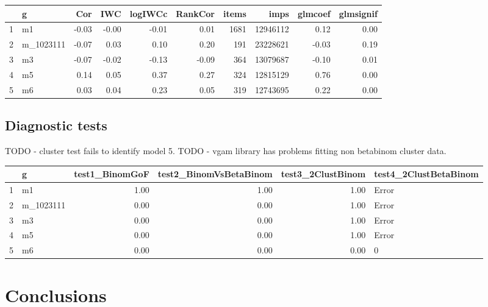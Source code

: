 \documentclass[12pt]{article}
\begin{document}
\begin{table}[ht]
\centering
\begin{tabular}{rlrrrrrrrr}
  \hline
 & g & Cor & IWC & logIWCc & RankCor & items & imps & glmcoef & glmsignif \\ 
  \hline
1 & m1 & -0.03 & -0.00 & -0.01 & 0.01 & 1681 & 12946112 & 0.12 & 0.00 \\ 
  2 & m\_1023111 & -0.07 & 0.03 & 0.10 & 0.20 & 191 & 23228621 & -0.03 & 0.19 \\ 
  3 & m3 & -0.07 & -0.02 & -0.13 & -0.09 & 364 & 13079687 & -0.10 & 0.01 \\ 
  4 & m5 & 0.14 & 0.05 & 0.37 & 0.27 & 324 & 12815129 & 0.76 & 0.00 \\ 
  5 & m6 & 0.03 & 0.04 & 0.23 & 0.05 & 319 & 12743695 & 0.22 & 0.00 \\ 
   \hline
\end{tabular}
\end{table}


\subsection{Diagnostic tests}

TODO - cluster test fails to identify model 5.
TODO - vgam library has problems fitting non betabinom cluster data.
\begin{table}[ht]
\centering
\begin{tabular}{rlrrrl}
  \hline
 & g & test1\_BinomGoF & test2\_BinomVsBetaBinom & test3\_2ClustBinom & test4\_2ClustBetaBinom \\ 
  \hline
1 & m1 & 1.00 & 1.00 & 1.00 & Error \\ 
  2 & m\_1023111 & 0.00 & 0.00 & 1.00 & Error \\ 
  3 & m3 & 0.00 & 0.00 & 1.00 & Error \\ 
  4 & m5 & 0.00 & 0.00 & 1.00 & Error \\ 
  5 & m6 & 0.00 & 0.00 & 0.00 & 0 \\ 
   \hline
\end{tabular}
\end{table}

\section{Conclusions}
\end{document}
